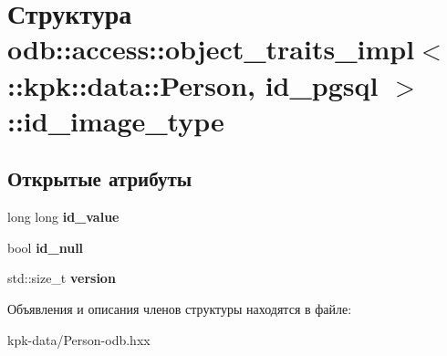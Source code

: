\hypertarget{structodb_1_1access_1_1object__traits__impl_3_01_1_1kpk_1_1data_1_1_person_00_01id__pgsql_01_4_1_1id__image__type}{}\section{Структура odb\+:\+:access\+:\+:object\+\_\+traits\+\_\+impl$<$ \+:\+:kpk\+:\+:data\+:\+:Person, id\+\_\+pgsql $>$\+:\+:id\+\_\+image\+\_\+type}
\label{structodb_1_1access_1_1object__traits__impl_3_01_1_1kpk_1_1data_1_1_person_00_01id__pgsql_01_4_1_1id__image__type}
\subsection*{Открытые атрибуты}
\begin{DoxyCompactItemize}
\item 
long long {\bfseries id\+\_\+value}\hypertarget{structodb_1_1access_1_1object__traits__impl_3_01_1_1kpk_1_1data_1_1_person_00_01id__pgsql_01_4_1_1id__image__type_a5aa166b770eec046211c09d6ed6fd56e}{}\label{structodb_1_1access_1_1object__traits__impl_3_01_1_1kpk_1_1data_1_1_person_00_01id__pgsql_01_4_1_1id__image__type_a5aa166b770eec046211c09d6ed6fd56e}

\item 
bool {\bfseries id\+\_\+null}\hypertarget{structodb_1_1access_1_1object__traits__impl_3_01_1_1kpk_1_1data_1_1_person_00_01id__pgsql_01_4_1_1id__image__type_ad0425ad9aeafb06231012bc55251822b}{}\label{structodb_1_1access_1_1object__traits__impl_3_01_1_1kpk_1_1data_1_1_person_00_01id__pgsql_01_4_1_1id__image__type_ad0425ad9aeafb06231012bc55251822b}

\item 
std\+::size\+\_\+t {\bfseries version}\hypertarget{structodb_1_1access_1_1object__traits__impl_3_01_1_1kpk_1_1data_1_1_person_00_01id__pgsql_01_4_1_1id__image__type_a2cc45589bbce6d15a8b42750b1d8dab0}{}\label{structodb_1_1access_1_1object__traits__impl_3_01_1_1kpk_1_1data_1_1_person_00_01id__pgsql_01_4_1_1id__image__type_a2cc45589bbce6d15a8b42750b1d8dab0}

\end{DoxyCompactItemize}


Объявления и описания членов структуры находятся в файле\+:\begin{DoxyCompactItemize}
\item 
kpk-\/data/Person-\/odb.\+hxx\end{DoxyCompactItemize}
